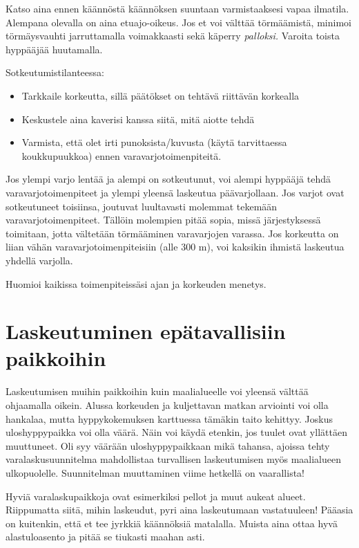 Katso aina ennen käännöstä käännöksen suuntaan varmistaaksesi vapaa ilmatila. Alempana olevalla on aina etuajo-oikeus. Jos et voi välttää törmäämistä, minimoi törmäysvauhti jarruttamalla voimakkaasti sekä käperry \textit{palloksi.} Varoita toista hyppääjää huutamalla. 


Sotkeutumistilanteessa: 

\begin{itemize}
\item  Tarkkaile korkeutta, sillä päätökset on tehtävä riittävän korkealla 
\item  Keskustele aina kaverisi kanssa siitä, mitä aiotte tehdä 
\item  Varmista, että olet irti punoksista/kuvusta (käytä tarvittaessa koukkupuukkoa) ennen varavarjotoimenpiteitä. 
\end{itemize}

Jos ylempi varjo lentää ja alempi on sotkeutunut, voi alempi hyppääjä tehdä varavarjotoimenpiteet ja ylempi yleensä laskeutua päävarjollaan. Jos varjot ovat sotkeutuneet toisiinsa, joutuvat luultavasti molemmat tekemään varavarjotoimenpiteet. Tällöin molempien pitää sopia, missä järjestyksessä toimitaan, jotta vältetään törmääminen varavarjojen varassa. Jos korkeutta on liian vähän varavarjotoimenpiteisiin (alle 300 m), voi kaksikin ihmistä laskeutua yhdellä varjolla. 


Huomioi kaikissa toimenpiteissäsi ajan ja korkeuden menetys. 

\section{ Laskeutuminen epätavallisiin paikkoihin  }
\label{mahdolliset-vaaratilanteet-laskeutuminen-epatavallisiin-paikkoihin}


Laskeutumisen muihin paikkoihin kuin maalialueelle voi yleensä välttää ohjaamalla oikein. Alussa korkeuden ja kuljettavan matkan arviointi voi olla hankalaa, mutta hyppykokemuksen karttuessa tämäkin taito kehittyy. Joskus uloshyppypaikka voi olla väärä. Näin voi käydä etenkin, jos tuulet ovat yllättäen muuttuneet. Oli syy väärään uloshyppypaikkaan mikä tahansa, ajoissa tehty varalaskusuunnitelma mahdollistaa turvallisen laskeutumisen myös maalialueen ulkopuolelle. Suunnitelman muuttaminen viime hetkellä on vaarallista! 


Hyviä varalaskupaikkoja ovat esimerkiksi pellot ja muut aukeat alueet. Riippumatta siitä, mihin laskeudut, pyri aina laskeutumaan vastatuuleen! Pääasia on kuitenkin, että et tee jyrkkiä käännöksiä matalalla. Muista aina ottaa hyvä alastuloasento ja pitää se tiukasti maahan asti. 



